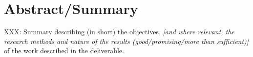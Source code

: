 \chapter{Abstract/Summary}
\label{sec:abstract}

XXX: Summary describing (in short) the objectives, \emph{[and where relevant, the
  research methods and nature of the results (good/promising/more than
  sufficient)]} of the work described in the deliverable.

\clearpage


